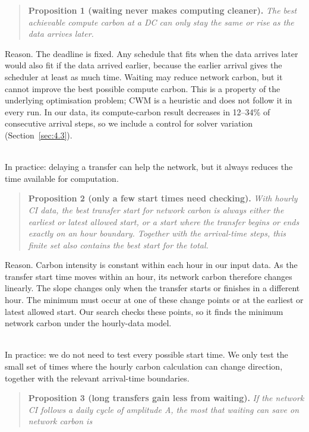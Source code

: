 \documentclass[12pt,a4paper,oneside,openany]{report}
\begin{document}
\begin{quote}
\textbf{Proposition 1 (waiting never makes computing cleaner).}
\emph{The best achievable compute carbon at a DC can only stay the same
or rise as the data arrives later.}
\end{quote}

Reason. The deadline is fixed. Any schedule that fits when the data
arrives later would also fit if the data arrived earlier, because the
earlier arrival gives the scheduler at least as much time. Waiting may
reduce network carbon, but it cannot improve the best possible compute
carbon. This is a property of the underlying optimisation problem; CWM
is a heuristic and does not follow it in every run. In our data, its
compute-carbon result decreases in 12--34\% of consecutive arrival
steps, so we include a control for solver variation (Section~\ref{sec:4.3}).\\
\strut \\
In practice: delaying a transfer can help the network, but it always
reduces the time available for computation.

\begin{quote}
\textbf{Proposition 2 (only a few start times need checking).}
\emph{With hourly CI data, the best transfer start for network carbon is
always either the earliest or latest allowed start, or a start where the
transfer begins or ends exactly on an hour boundary. Together with the
arrival-time steps, this finite set also contains the best start for the
total.}
\end{quote}

Reason. Carbon intensity is constant within each hour in our input data.
As the transfer start time moves within an hour, its network carbon
therefore changes linearly. The slope changes only when the transfer
starts or finishes in a different hour. The minimum must occur at one of
these change points or at the earliest or latest allowed start. Our
search checks these points, so it finds the minimum network carbon under
the hourly-data model.\\
\strut \\
In practice: we do not need to test every possible start time. We only
test the small set of times where the hourly carbon calculation can
change direction, together with the relevant arrival-time boundaries.

\begin{quote}
\textbf{Proposition 3 (long transfers gain less from waiting).} \emph{If
the network CI follows a daily cycle of amplitude A, the most that
waiting can save on network carbon is}
\end{quote}
\end{document}

